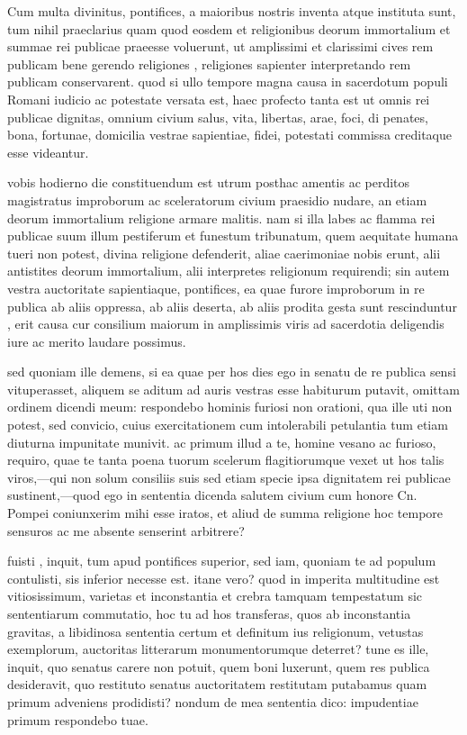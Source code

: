 
 Cum multa divinitus, pontifices, a maioribus nostris inventa atque instituta sunt, tum nihil praeclarius quam quod eosdem et religionibus deorum immortalium et summae rei publicae praeesse voluerunt, ut amplissimi et clarissimi cives rem publicam bene gerendo religiones , religiones sapienter interpretando rem publicam conservarent. quod si ullo tempore magna causa in sacerdotum populi Romani iudicio ac potestate versata est, haec profecto tanta est ut omnis rei publicae dignitas, omnium civium salus, vita, libertas, arae, foci, di penates, bona, fortunae, domicilia vestrae sapientiae, fidei, potestati commissa creditaque esse videantur.

 vobis hodierno die constituendum est utrum posthac amentis ac perditos magistratus improborum ac sceleratorum civium praesidio nudare, an etiam deorum immortalium religione armare malitis. nam si illa labes ac flamma rei publicae suum illum pestiferum et funestum tribunatum, quem aequitate humana tueri non potest, divina religione defenderit, aliae caerimoniae nobis erunt, alii antistites deorum immortalium, alii interpretes religionum requirendi; sin autem vestra auctoritate sapientiaque, pontifices, ea quae furore improborum in re publica ab aliis oppressa, ab aliis deserta, ab aliis prodita gesta sunt rescinduntur , erit causa cur consilium maiorum in amplissimis viris ad sacerdotia deligendis iure ac merito laudare possimus.

 sed quoniam ille demens, si ea quae per hos dies ego in senatu de re publica sensi vituperasset, aliquem se aditum ad auris vestras esse habiturum putavit, omittam ordinem dicendi meum: respondebo hominis furiosi non orationi, qua ille uti non potest, sed convicio, cuius exercitationem cum intolerabili petulantia tum etiam diuturna impunitate munivit. ac primum illud a te, homine vesano ac furioso, requiro, quae te tanta poena tuorum scelerum flagitiorumque vexet ut hos talis viros,—qui non solum consiliis suis sed etiam specie ipsa dignitatem rei publicae sustinent,—quod ego in sententia dicenda salutem civium cum honore Cn. Pompei coniunxerim mihi esse iratos, et aliud de summa religione hoc tempore sensuros ac me absente senserint arbitrere?

 fuisti , inquit, tum apud pontifices superior, sed iam, quoniam te ad populum contulisti, sis inferior necesse est. itane vero? quod in imperita multitudine est vitiosissimum, varietas et inconstantia et crebra tamquam tempestatum sic sententiarum commutatio, hoc tu ad hos transferas, quos ab inconstantia gravitas, a libidinosa sententia certum et definitum ius religionum, vetustas exemplorum, auctoritas litterarum monumentorumque deterret? tune es ille, inquit, quo senatus carere non potuit, quem boni luxerunt, quem res publica desideravit, quo restituto senatus auctoritatem restitutam putabamus quam primum adveniens prodidisti? nondum de mea sententia dico: impudentiae primum respondebo tuae.

